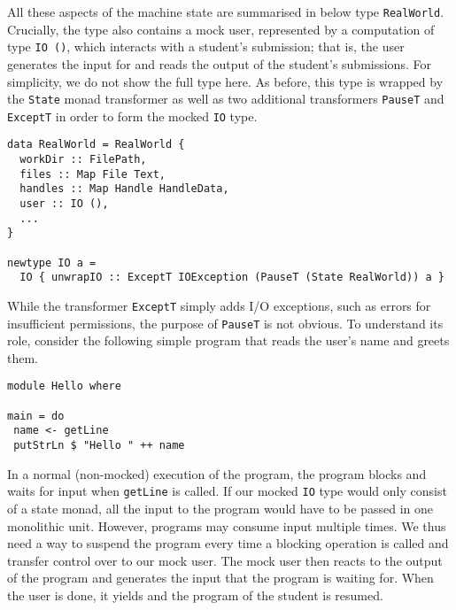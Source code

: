 All these aspects of the machine state are summarised in below type \texttt{RealWorld}.
Crucially, the type also contains a mock user,
represented by a computation of type \texttt{IO ()},
which interacts with a student's submission;
that is, the user generates the input for and reads the output of the student's submissions.
For simplicity, we do not show the full type here.
As before, this type is wrapped by the \texttt{State} monad transformer as well as two additional transformers \texttt{PauseT} and \texttt{ExceptT} in order to form the mocked \texttt{IO} type.
\begin{verbatim}
data RealWorld = RealWorld {
  workDir :: FilePath,
  files :: Map File Text,
  handles :: Map Handle HandleData,
  user :: IO (),
  ...
}

newtype IO a =
  IO { unwrapIO :: ExceptT IOException (PauseT (State RealWorld)) a }
\end{verbatim}
While the transformer \texttt{ExceptT} simply adds I/O exceptions,
such as errors for insufficient permissions,
the purpose of \texttt{PauseT} is not obvious.
To understand its role, consider the following simple program that reads the user's name and greets them.
\begin{verbatim}
module Hello where

main = do
 name <- getLine
 putStrLn $ "Hello " ++ name
\end{verbatim}
In a normal (non-mocked) execution of the program, the program blocks and waits for input when \texttt{getLine} is called.
If our mocked \texttt{IO} type would only consist of a state monad,
all the input to the program would have to be passed in one monolithic unit.
However, programs may consume input multiple times.
We thus need a way to suspend the program every time a blocking operation is called and transfer control over to our mock user.
The mock user then reacts to the output of the program and generates the input that the program is waiting for.
When the user is done, it yields and the program of the student is resumed.

